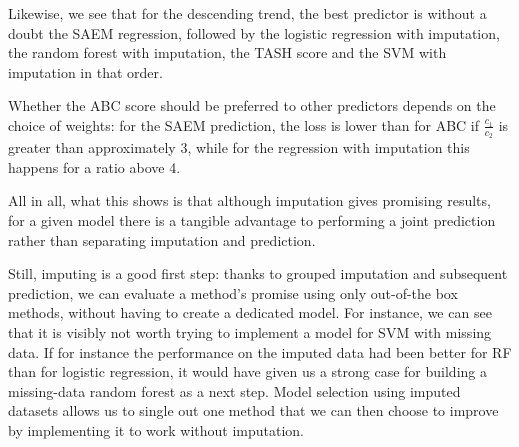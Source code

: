 Likewise, we see that for the descending trend, the best predictor is without a doubt the SAEM regression, followed by the logistic regression with imputation, the random forest with imputation, the TASH score and the SVM with imputation in that order.

Whether the ABC score should be preferred to other predictors depends on the choice of weights: for the SAEM prediction, the loss is lower than for ABC if $\frac{c_1}{c_2}$ is greater than approximately 3, while for the regression with imputation this happens for a ratio above 4.

All in all, what this shows is that although imputation gives promising results, for a given model there is a tangible advantage to performing a joint prediction rather than separating imputation and prediction. 

Still, imputing is a good first step: thanks to grouped imputation and subsequent prediction, we can evaluate a method's promise using only out-of-the box methods, without having to create a dedicated model. For instance, we can see that it is visibly not worth trying to implement a model for SVM with missing data. If for instance the performance on the imputed data had been better for RF than for logistic regression, it would have given us a strong case for building a missing-data random forest as a next step. Model selection using imputed datasets allows us to single out one method that we can then choose to improve by implementing it to work without imputation. 